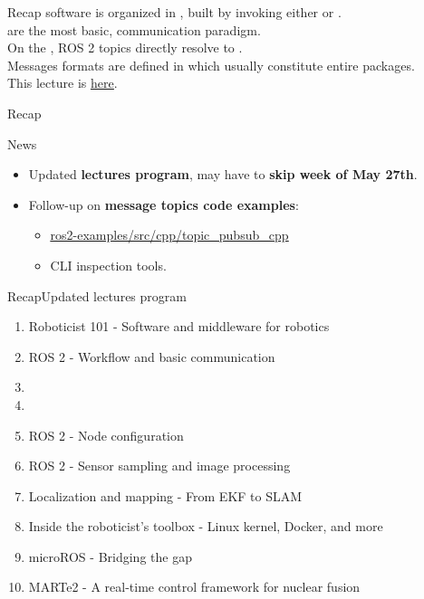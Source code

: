 
\begin{frame}{Recap}
	 software is organized in , built by  invoking either  or .\\
	\bigskip
	 are the most basic,  communication paradigm.\\
	On the , ROS 2 topics directly resolve to .\\
	\bigskip
	Messages formats are defined in  which usually constitute entire packages.\\
	\bigskip
	This lecture is \href{https://github.com/robmasocco/DAFN24_Robotics_3}{\color{blue}\underline{here}}.
\end{frame}
\begin{frame}{Recap}
	\begin{block}{News}
		\begin{itemize}
			\item Updated \textbf{lectures program}, may have to \textbf{skip week of May 27th}.
			\item Follow-up on \textbf{message topics code examples}:
			      \begin{itemize}
				      \item \href{https://github.com/IntelligentSystemsLabUTV/ros2-examples/tree/humble/src/cpp/topic_pubsub_cpp}{\color{blue}\underline{ros2-examples/src/cpp/topic\_pubsub\_cpp}}
				      \item CLI inspection tools.
			      \end{itemize}
		\end{itemize}
	\end{block}
\end{frame}
\begin{frame}{Recap}{Updated lectures program}
	\begin{enumerate}
		\item Roboticist 101 - Software and middleware for robotics
		\item ROS 2 - Workflow and basic communication
		\item {}
		\item {}
		\item ROS 2 - Node configuration
		\item ROS 2 - Sensor sampling and image processing
		\item Localization and mapping - From EKF to SLAM
		\item Inside the roboticist's toolbox - Linux kernel, Docker, and more
		\item microROS - Bridging the gap
		\item MARTe2 - A real-time control framework for nuclear fusion
	\end{enumerate}
\end{frame}
